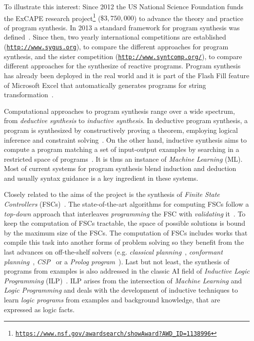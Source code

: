 \documentclass[10pt,a4paper]{paper}
\begin{document}
To illustrate this interest: Since 2012 the {\sc US National Science Foundation} funds the ExCAPE research project\footnote{\tt\url{https://www.nsf.gov/awardsearch/showAward?AWD_ID=1138996}} ($\$3,750,000$) to advance the theory and practice of program synthesis. In 2013 a standard framework for program synthesis was defined~\cite{alur2013syntax}. Since then, two yearly international competitions are established ({\small\tt\url{http://www.sygus.org}}), to compare the different approaches for program synthesis, and the sister competition ({\small\tt\url{http://www.syntcomp.org/}}), to compare different approaches for the synthesize of reactive programs. Program synthesis has already been deployed in the real world and it is part of the {\sc Flash Fill} feature of {\sc Microsoft Excel} that automatically generates programs for string transformation~\cite{gulwani2011automating}.

Computational approaches to program synthesis range over a wide spectrum, from {\em deductive synthesis} to {\em inductive synthesis}. In deductive program synthesis, a program is synthesized by constructively proving a theorem, employing logical inference and constraint solving~\cite{manna1986deductive}. On the other hand, inductive synthesis aims to compute a program matching a set of input-output examples by searching in a restricted space of programs~\cite{summers1977methodology,shapiro1983algorithmic}. It is thus an instance of {\em Machine Learning} (ML). Most of current systems for program synthesis blend induction and deduction~\cite{seshia2015combining} and usually syntax guidance is a key ingredient in these systems. 

Closely related to the aims of the project is the synthesis of {\it Finite State Controllers} (FSCs)~\cite{geffner:policies:IJCAI15}. The state-of-the-art algorithms for computing FSCs follow a {\it top-down} approach that interleaves {\it programming} the FSC with {\em validating} it~\cite{sergio:aprograming:ijcai16,segovia:FSC:JAIR2018}. To keep the computation of FSCs tractable, the space of possible solutions is bound by the maximum size of the FSCs. The computation of FSCs includes works that compile this task into another forms of problem solving so they benefit from the last advances on off-the-shelf solvers (e.g. {\em classical planning}~\cite{sergio:aprograming:icaps16}, {\em conformant planning}~\cite{Geffner:FSM:AAAI10}, {\em CSP}~\cite{Infantes:FSC:ECAI2010} or a {\em Prolog program}~\cite{Giacomo:FSM:ICAPS13}). Last but not least, the synthesis of programs from examples is also addressed in the classic AI field of {\em Inductive Logic Programming} (ILP)~\cite{muggleton1991inductive,Raedt:relationalML:book2008}. ILP arises from the intersection of {\em Machine Learning} and {\em Logic Programming} and deals with the development of inductive techniques to learn {\em logic programs} from examples and background knowledge, that are expressed as logic facts.
\end{document}

